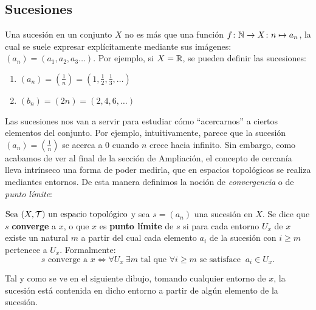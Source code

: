 \subsection*{Sucesiones}

Una sucesión en un conjunto $X$ no es más que una función $f\colon\N \to X\colon n\mapsto a_n$, la cual se suele expresar explícitamente mediante sus imágenes: $(a_n) = (a_1, a_2, a_3\ldots)$. Por ejemplo, si $X = \R$, se pueden definir las sucesiones:
\begin{enumerate}[label=--]
    \item $(a_n) = \left(\frac1n\right) = \left(1, \frac12, \frac13,\ldots\right)$
    \item $(b_n) = \left(2n\right) = \left(2, 4, 6,\ldots\right)$
\end{enumerate}

Las sucesiones nos van a servir para estudiar cómo ``acercarnos'' a ciertos elementos del conjunto. Por ejemplo, intuitivamente, parece que la sucesión $(a_n) = \left(\frac1n\right)$ se acerca a $0$ cuando $n$ crece hacia infinito. Sin embargo, como acabamos de ver al final de la sección de Ampliación, el concepto de cercanía lleva intrínseco una forma de poder medirla, que en espacios topológicos se realiza mediantes entornos. De esta manera definimos la noción de \textit{convergencia} o de \textit{punto límite}:

\begin{deff}
    $\seatop$ y sea $s = (a_n)$ una sucesión en $X$. Se dice que $s$ \textbf{converge} a $x$, o que $x$ es \textbf{punto límite} de $s$ si para cada entorno $U_x$ de $x$ existe un natural $m$ a partir del cual cada elemento $a_i$ de la sucesión con $i\geq m$ pertenece a $U_x$. Formalmente:
    \[
        s \text{ converge a } x \iff \forall U_x \ \exists m\text{ tal que } \forall i\geq m \text{ se satisface } \ a_i \in U_x.
    \]
\end{deff}

Tal y como se ve en el siguiente dibujo, tomando cualquier entorno de $x$, la sucesión está contenida en dicho entorno a partir de algún elemento de la sucesión.

